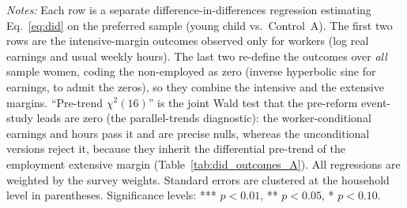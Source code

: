 \begin{table}[H]\centering
\caption{Earnings and Hours: Worker-Conditional and Unconditional Estimates}
\label{tab:earnings_margins}\small
{}
\par\vspace{3pt}\footnotesize\raggedright \textit{Notes:} Each row is a separate difference-in-differences regression estimating Eq.~\eqref{eq:did} on the preferred sample (young child vs.\ Control~A). The first two rows are the intensive-margin outcomes observed only for workers (log real earnings and usual weekly hours). The last two re-define the outcomes over \emph{all} sample women, coding the non-employed as zero (inverse hyperbolic sine for earnings, to admit the zeros), so they combine the intensive and the extensive margins. ``Pre-trend $\chi^2(16)$'' is the joint Wald test that the pre-reform event-study leads are zero (the parallel-trends diagnostic): the worker-conditional earnings and hours pass it and are precise nulls, whereas the unconditional versions reject it, because they inherit the differential pre-trend of the employment extensive margin (Table~\ref{tab:did_outcomes_A}). All regressions are weighted by the survey weights. Standard errors are clustered at the household level in parentheses. Significance levels: *** $p<0.01$, ** $p<0.05$, * $p<0.10$.
\end{table}

